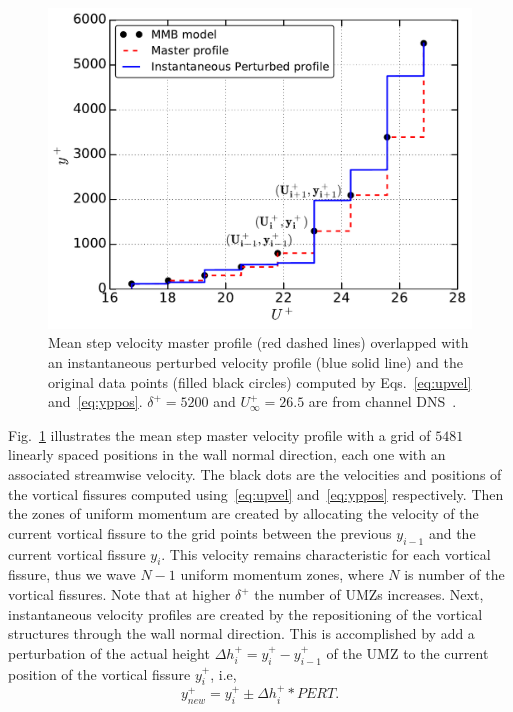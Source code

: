 \documentclass[aps,reprint,amsmath,amssymb,pra]{revtex4-1}%
\begin{document}
\begin{figure}[tb]
\includegraphics[scale=0.45]{figures/Master_step_profilev2}
\caption{\label{fig:master_profile} Mean step velocity master profile (red dashed lines) overlapped with an instantaneous perturbed velocity profile (blue solid line) and the original data points (filled black circles) computed by Eqs.~\eqref{eq:upvel} and~\eqref{eq:yppos}. $\delta^+=5200$ and $U^+_{\infty}=26.5$ are from channel DNS~\citep{leemoser2015}.}
\end{figure} 


Fig.~\ref{fig:master_profile} illustrates the mean step master velocity profile with a grid of $5481$ linearly spaced positions in the wall normal direction, each one with an associated streamwise velocity. The black dots are the velocities and positions of the vortical fissures computed using~\eqref{eq:upvel} and~\eqref{eq:yppos} respectively. Then the zones of uniform momentum are created by allocating the velocity of the current vortical fissure to the grid points between the previous $y_{i-1}$ and the current vortical fissure $y_i$. This velocity remains characteristic for each vortical fissure, thus we wave $N-1$ uniform momentum zones, where $N$ is number of the vortical fissures. Note that at higher $\delta^+$ the number of UMZs increases.
Next, instantaneous velocity profiles are created by the repositioning of the vortical structures through the wall normal direction. This is accomplished by add a perturbation of the actual height $\Delta h^+_i=y^+_i-y^+_{i-1}$ of the UMZ to the current position of the vortical fissure $y^+_i$, i.e, 
\begin{equation}\label{eq:ypert}
y^+_{new}=y^+_i\pm \Delta h^+_i*PERT.
\end{equation}
\end{document}
